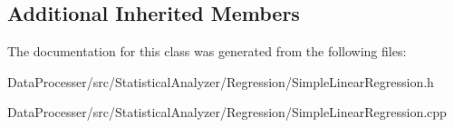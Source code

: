 \subsection*{Additional Inherited Members}


The documentation for this class was generated from the following files\+:\begin{DoxyCompactItemize}
\item 
Data\+Processer/src/\+Statistical\+Analyzer/\+Regression/Simple\+Linear\+Regression.\+h\item 
Data\+Processer/src/\+Statistical\+Analyzer/\+Regression/Simple\+Linear\+Regression.\+cpp\end{DoxyCompactItemize}
